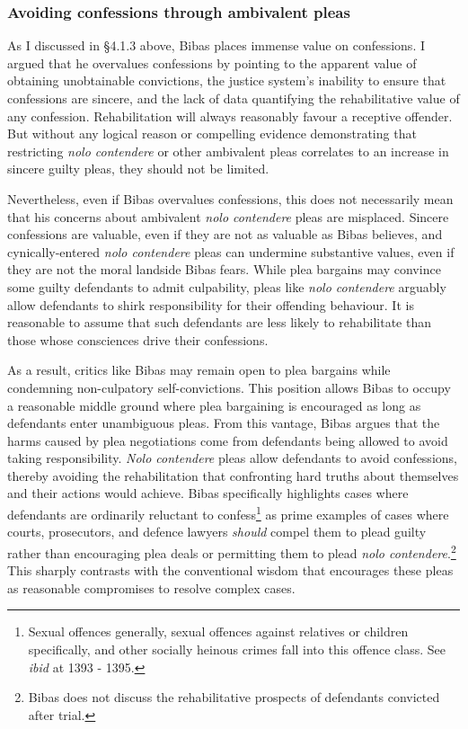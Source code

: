 \subsubsection{Avoiding confessions through ambivalent pleas}

As I discussed in \S 4.1.3 above, Bibas places immense value on confessions. I argued that he overvalues confessions by pointing to the apparent value of obtaining unobtainable convictions, the justice system's inability to ensure that confessions are sincere, and the lack of data quantifying the rehabilitative value of any confession. Rehabilitation will always reasonably favour a receptive offender. But without any logical reason or compelling evidence demonstrating that restricting \textit{nolo contendere} or other ambivalent pleas correlates to an increase in sincere guilty pleas, they should not be limited.

Nevertheless, even if Bibas overvalues confessions, this does not necessarily mean that his concerns about ambivalent \textit{nolo contendere} pleas are misplaced. Sincere confessions are valuable, even if they are not as valuable as Bibas believes, and cynically-entered \textit{nolo contendere} pleas can undermine substantive values, even if they are not the moral landside Bibas fears. While plea bargains may convince some guilty defendants to admit culpability, pleas like \textit{nolo contendere} arguably allow defendants to shirk responsibility for their offending behaviour. It is reasonable to assume that such defendants are less likely to rehabilitate than those whose consciences drive their confessions.

As a result, critics like Bibas may remain open to plea bargains while condemning non-culpatory self-convictions. This position allows Bibas to occupy a reasonable middle ground where plea bargaining is encouraged as long as defendants enter unambiguous pleas. From this vantage, Bibas argues that the harms caused by plea negotiations come from defendants being allowed to avoid taking responsibility. \textit{Nolo contendere} pleas allow defendants to avoid confessions, thereby avoiding the rehabilitation that confronting hard truths about themselves and their actions would achieve. Bibas specifically highlights cases where defendants are ordinarily reluctant to confess\footnote{Sexual offences generally, sexual offences against relatives or children specifically, and other socially heinous crimes fall into this offence class. See \textit{ibid} at 1393 - 1395.} as prime examples of cases where courts, prosecutors, and defence lawyers \textit{should} compel them to plead guilty rather than encouraging plea deals or permitting them to plead \textit{nolo contendere}.\footnote{Bibas does not discuss the rehabilitative prospects of defendants convicted after trial.} This sharply contrasts with the conventional wisdom that encourages these pleas as reasonable compromises to resolve complex cases.

